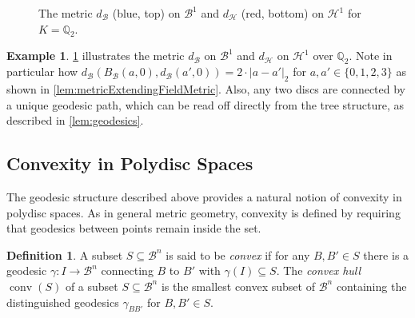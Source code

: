 \documentclass[10pt]{article}
\theoremstyle{definition}
\newtheorem{definition}[theorem]{Definition}
\newtheorem{example}[theorem]{Example}
\newcommand{\QQ}{\mathbb{Q}}
\DeclareMathOperator{\conv}{conv}
\begin{document}
\begin{figure}
\vspace{-2mm}
  \caption{The metric $d_{\mathcal{B}}$ (blue, top) on $\mathcal B^1$ and $d_{\mathcal{H}}$ (red, bottom) on $\mathcal H^1$ for $K=\QQ_2$.}
  \label{fig:metric}
\end{figure}

\begin{example}
  \label{ex:metric}
  \cref{fig:metric} illustrates the metric $d_{\mathcal{B}}$ on $\mathcal B^1$ and $d_{\mathcal{H}}$ on $\mathcal H^1$ over $\QQ_2$.  Note in particular how $d_{\mathcal{B}}(B_{\mathcal{B}}(a,0),d_{\mathcal{B}}(a',0)) = 2\cdot |a-a'|_2$ for $a,a'\in\{0,1,2,3\}$ as shown in \cref{lem:metricExtendingFieldMetric}.  
  Also, any two discs are connected by a unique geodesic path, which can be read off directly from the tree structure, as described in \cref{lem:geodesics}.
\end{example}


\subsection{Convexity in Polydisc Spaces}\label{sec:convexity}

The geodesic structure described above provides a natural notion of convexity in polydisc spaces. As in general metric geometry, convexity is defined by requiring that geodesics between points remain inside the set.

\begin{definition}
  \label{def:convexity}
  A subset $S\subseteq \mathcal{B}^n$ is said to be \emph{convex} if for any $B, B' \in S$ there is a geodesic $\gamma\colon I\rightarrow\mathcal B^n$ connecting $B$ to $B'$ with $\gamma(I)\subseteq S$.
  The \emph{convex hull} $\conv(S)$ of a subset $S \subseteq \mathcal B^n$ is the smallest convex subset of $\mathcal B^n$ containing the distinguished geodesics $\gamma_{BB'}$ for $B,B'\in S$.
\end{definition}
\end{document}
